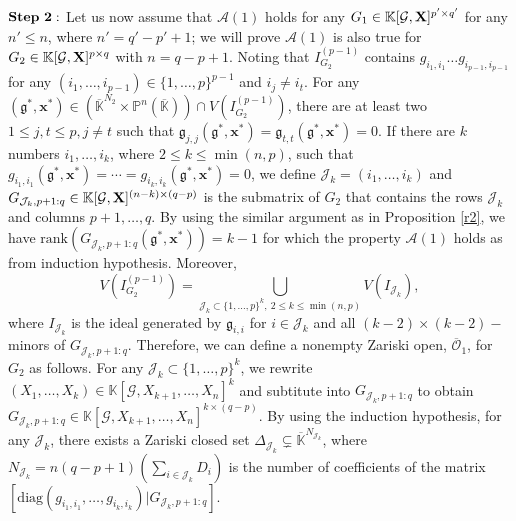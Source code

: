 \documentclass[11pt]{article}
\numberwithin{Property}{section}
\numberwithin{Theorem}{section}
\numberwithin{Proposition}{section}
\numberwithin{Lemma}{section}
\numberwithin{Corollary}{section}
\numberwithin{Definition}{section}
\numberwithin{Remark}{section}
\numberwithin{Conjecture}{section}
\numberwithin{Problem}{section}
\numberwithin{Claim}{section}
\theoremstyle{definition}
\numberwithin{Example}{section}
\renewcommand{\leq}{\leqslant}
\def\bar{\overline}
\newcommand{\field}{\mathbb{K}} %
\newcommand{\mat}[1]{\mathbf{\MakeUppercase{#1}}} %
\begin{document}
$\bf{Step \ 2:}$ Let us now assume that $\mathcal{A}(1)$ holds for any $G_1 \in \field[{\mathcal{G}, \mat{X}}]^{p' \times q'}$ for any $n' \leq n$, where $n' = q'-p'+1$; we will prove $\mathcal{A}(1)$ is also true for $G_2 \in \field[\mathcal{G}, \mat{X}]^{p \times q}$ with $n = q-p+1$. Noting that $I_{G_2}^{(p-1)}$ contains $g_{i_1, i_1}\ldots g_{i_{p-1}, i_{p-1}}$ for any $(i_1, \ldots, i_{p-1}) \in \{1, \ldots, p\}^{p-1}$ and $i_j \ne i_t$. For any $(\mathfrak{g}^*, \mathbf{x}^*) \in (\bar{\field}^{N_2} \times \mathbb{P}^{n}(\bar{\field})) \cap V(I_{G_2}^{(p-1)})$, there are at least two $1\leq j,t \leq p, j \ne t$ such that $\mathfrak{g}_{j,j}(\mathfrak{g}^*, \mathbf{x}^*) = \mathfrak{g}_{t,t}(\mathfrak{g}^*, \mathbf{x}^*) = 0$. If there are $k$ numbers $i_1, \ldots, i_k$, where $2 \leq k \leq \min(n,p)$, such that $g_{i_1, i_1}(\mathfrak{g}^*, \mathbf{x}^*) = \cdots = g_{i_k, i_k}(\mathfrak{g}^*, \mathbf{x}^*) = 0$, we define $\mathcal{J}_k = (i_1, \ldots, i_k)$ and $G_{\mathcal{J}_k, p+1:q} \in \field[\mathcal{G}, \mat{X}]^{(n-k)\times (q-p)}$ is the submatrix of $G_2$ that contains the rows $\mathcal{J}_k$ and columns $p+1, \ldots, q$. By using the similar argument as in Proposition \ref{r2}, we have $\mathrm{rank}(G_{\mathcal{J}_k, p+1:q}(\mathfrak{g}^*, \mathbf{x}^*)) = k-1$ for which the property $\mathcal{A}(1)$ holds as from induction hypothesis. Moreover, $$V(I_{G_2}^{(p-1)}) = \bigcup\limits_{\mathcal{J}_k \subset\{1, \ldots, p\}^k, \ 2 \leq k \leq \min(n,p)} V(I_{\mathcal{J}_k}),$$ where $I_{\mathcal{J}_k}$ is the ideal generated by $\mathfrak{g}_{i,i}$ for $i \in \mathcal{J}_k$ and all $(k-2)\times(k-2) -$ minors of $G_{\mathcal{J}_k, p+1:q}$. Therefore, we can define a nonempty Zariski open, $\bar{\mathcal{O}}_1$, for $G_2$ as follows. For any $\mathcal{J}_k \subset \{1, \ldots, p\}^k$, we rewrite $(X_1, \ldots, X_k) \in \field[\mathcal{G}, X_{k+1}, \ldots, X_n]^{k}$ and subtitute into $G_{\mathcal{J}_k, p+1:q}$ to obtain $G_{\mathcal{J}_k, p+1:q} \in \field[\mathcal{G}, X_{k+1}, \ldots, X_n]^{k \times {(q-p)}}$. By using the induction hypothesis, for any $\mathcal{J}_k$, there exists a Zariski closed set $\Delta_{\mathcal{J}_k} \subsetneq \bar{\field}^{N_{\mathcal{J}_k}}$, where $N_{\mathcal{J}_k} = n(q-p+1)(\sum_{i \in \mathcal{J}_k}D_i)$ is the number of coefficients of the matrix $[\mathrm{diag}(g_{i_1, i_1}, \ldots, g_{i_k, i_k})|G_{\mathcal{J}_k, p+1:q}]$. %
\end{document}
